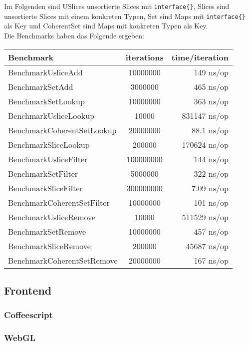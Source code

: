 Im Folgenden sind USlices unsortierte Slices mit \verb+interface{}+, Slices sind unsortierte Slices mit einem konkreten Typen, Set sind Maps mit \verb+interface{}+ als Key und CoherentSet sind Maps mit konkreten Typen als Key. \\
Die Benchmarks haben das Folgende ergeben:
\begin{tabular}{ l | c | r }
Benchmark & iterations & time/iteration \\
\hline
BenchmarkUsliceAdd & 10000000 & 149 ns/op \\
BenchmarkSetAdd	& 3000000 & 465 ns/op \\
BenchmarkSetLookup & 10000000 & 363 ns/op \\
BenchmarkUsliceLookup & 10000 & 831147 ns/op \\
BenchmarkCoherentSetLookup & 20000000 & 88.1 ns/op \\
BenchmarkSliceLookup & 200000 & 170624 ns/op \\
BenchmarkUsliceFilter & 100000000 & 144 ns/op \\
BenchmarkSetFilter & 5000000 & 322 ns/op \\
BenchmarkSliceFilter & 300000000 & 7.09 ns/op \\
BenchmarkCoherentSetFilter & 10000000 & 101 ns/op \\
BenchmarkUsliceRemove & 10000 & 511529 ns/op \\
BenchmarkSetRemove & 10000000 & 457 ns/op \\
BenchmarkSliceRemove & 200000 & 45687 ns/op \\
BenchmarkCoherentSetRemove & 20000000 & 167 ns/op \\
\hline
\end{tabular}

\subsection{Frontend}
\subsubsection{Coffeescript}
\subsubsection{WebGL}
